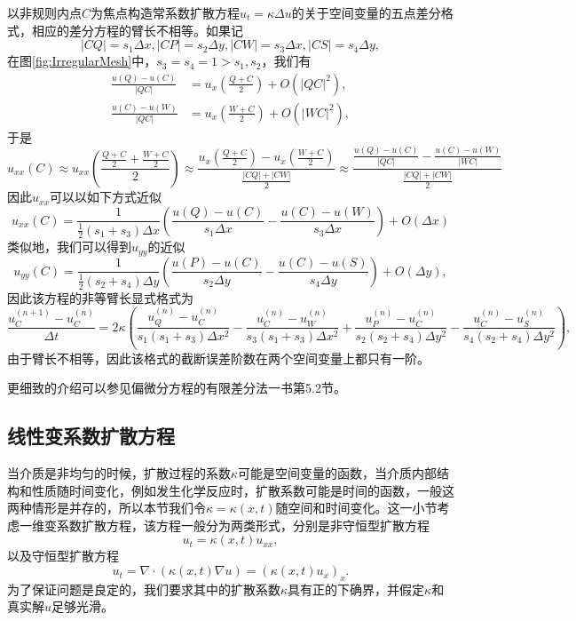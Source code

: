\documentclass[a4paper,10pt]{ctexart}
\begin{document}
\begin{example}
    以非规则内点$ C $为焦点构造常系数扩散方程$ u_t = \kappa\Delta u $的关于空间变量的五点差分格式，相应的差分方程的臂长不相等。如果记
    \[
        |CQ| = s_1 \Delta x, |CP| = s_2 \Delta y, |CW| = s_3 \Delta x, |CS| = s_4 \Delta y,
    \]
    在图\ref{fig:IrregularMesh}中，$ s_3=s_4=1>s_1,s_2 $，我们有
    \[
        \begin{aligned}
            \frac{u(Q) - u(C)}{|QC|} &= u_x(\frac{Q+C}{2}) + O(|QC|^2),\\
            \frac{u(C) - u(W)}{|QC|} &= u_x(\frac{W+C}{2}) + O(|WC|^2),
        \end{aligned}
    \]
    于是
    \[
        u_{xx}(C) \approx u_{xx}(\frac{\frac{Q+C}{2}+\frac{W+C}{2}}{2})\approx \frac{u_x(\frac{Q+C}{2})-u_x(\frac{W+C}{2})}{\frac{|CQ|+|CW|}{2}} \approx \frac{\frac{u(Q) - u(C)}{|QC|} - \frac{u(C) - u(W)}{|WC|}}{\frac{|CQ|+|CW|}{2}}
    \]
    因此$ u_{xx} $可以以如下方式近似
    \begin{equation}
        u_{xx}(C) = \frac{1}{\frac{1}{2}(s_1+s_3)\Delta x}\left( \frac{u(Q) - u(C)}{s_1 \Delta x} - \frac{u(C)-u(W)}{s_3\Delta x} \right) + O(\Delta x)
    \end{equation}
    类似地，我们可以得到$ u_{yy} $的近似
    \begin{equation}
        u_{yy}(C) = \frac{1}{\frac{1}{2}(s_2+s_4)\Delta y}\left( \frac{u(P) - u(C)}{s_2 \Delta y} - \frac{u(C)-u(S)}{s_4\Delta y} \right) + O(\Delta y),
    \end{equation}
    因此该方程的非等臂长显式格式为
    \begin{equation}
        \frac{u^{(n+1)}_C-u^{(n)}_C}{\Delta t} = 2\kappa \left( \frac{u^{(n)}_Q - u^{(n)}_C}{s_1(s_1+s_3) \Delta x^2} - \frac{u^{(n)}_C - u^{(n)}_W}{s_3(s_1+s_3) \Delta x^2} + \frac{u^{(n)}_P - u^{(n)}_C}{s_2(s_2+s_4) \Delta y^2} - \frac{u^{(n)}_C - u^{(n)}_S}{s_4(s_2+s_4) \Delta y^2} \right),
    \end{equation}
    由于臂长不相等，因此该格式的截断误差阶数在两个空间变量上都只有一阶。
\end{example}

更细致的介绍可以参见偏微分方程的有限差分法一书第5.2节。

\subsection{线性变系数扩散方程}
当介质是非均匀的时候，扩散过程的系数$ \kappa $可能是空间变量的函数，当介质内部结构和性质随时间变化，例如发生化学反应时，扩散系数可能是时间的函数，一般这两种情形是并存的，所以本节我们令$ \kappa=\kappa(x,t) $随空间和时间变化。这一小节考虑一维变系数扩散方程，该方程一般分为两类形式，分别是非守恒型扩散方程
\begin{equation}
    u_t = \kappa(x,t) u_{xx},
\end{equation}
以及守恒型扩散方程
\begin{equation}
    u_t = \nabla\cdot(\kappa(x,t)\nabla u) = (\kappa(x,t)u_x)_x.
\end{equation}
为了保证问题是良定的，我们要求其中的扩散系数$ \kappa $具有正的下确界，并假定$ \kappa $和真实解$ u $足够光滑。
\end{document}
